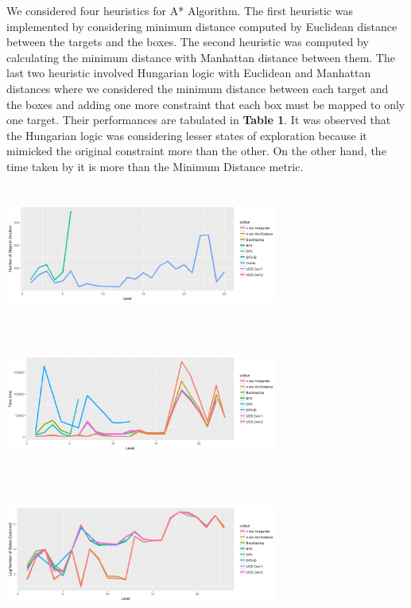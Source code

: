 \documentclass[10pt, final]{article}
\begin{document}
\begin{multicols}{2}
	We considered four heuristics for A* Algorithm. The first heuristic was implemented by considering minimum distance computed by Euclidean distance between the targets and the boxes. The second heuristic was computed by calculating the minimum distance with Manhattan distance between them. The last two heuristic involved Hungarian logic with Euclidean and Manhattan distances where we considered the minimum distance between each target and the boxes and adding one more constraint that each box must be mapped to only one target. Their performances are tabulated in \textbf{Table 1}. It was observed that the Hungarian logic was considering lesser states of exploration because it mimicked the original constraint more than the other. On the other hand, the time taken by it is more than the Minimum Distance metric. 
		\begin{center}
		\includegraphics[width=9cm, height=4.5cm]{solution_step.png}
	\end{center}
	\begin{center}
		\includegraphics[width=9cm, height=4.5cm]{Time.png}
	\end{center}
	\begin{center}
	\includegraphics[width=9cm, height=4.5cm]{states_explored.png}

\end{center}
\end{multicols}
\end{document}
